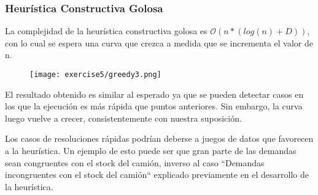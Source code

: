 \subsubsection{Heurística Constructiva Golosa}

La complejidad de la heurística constructiva golosa es $\mathcal{O}(n * (log(n) + D))$, con lo cual se espera una curva que crezca a medida que se incrementa el valor de n.

\begin{figure}[H]
	\centering
	\texttt{[image: exercise5/greedy3.png]}
\end{figure}

El resultado obtenido es similar al esperado ya que se pueden detectar casos en los que la ejecución es más rápida que puntos anteriores. Sin embargo, la curva luego vuelve a crecer, consistentemente con nuestra suposición. 

Los casos de resoluciones rápidas podrían deberse a juegos de datos que favorecen a la heurística. Un ejemplo de esto puede ser que gran parte de las demandas sean congruentes con el stock del camión, inverso al caso ``Demandas incongruentes con el stock del camión`` explicado previamente en el desarrollo de la heurística.